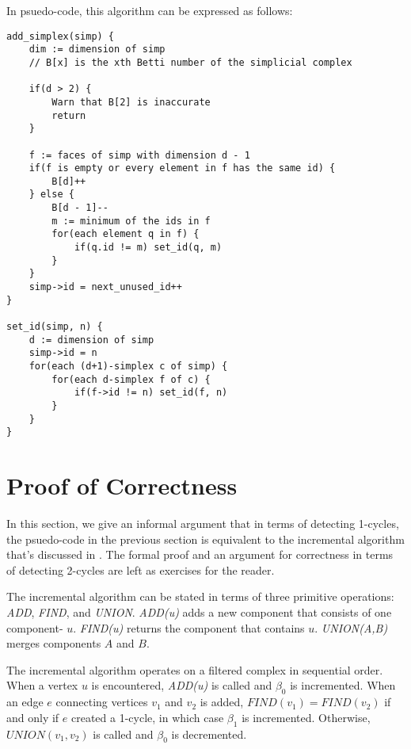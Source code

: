 \documentclass{article}
\begin{document}
In psuedo-code, this algorithm can be expressed as follows:
\begin{verbatim}
add_simplex(simp) {
    dim := dimension of simp
    // B[x] is the xth Betti number of the simplicial complex

    if(d > 2) {
        Warn that B[2] is inaccurate
        return
    }

    f := faces of simp with dimension d - 1
    if(f is empty or every element in f has the same id) {
        B[d]++
    } else {
        B[d - 1]--
        m := minimum of the ids in f
        for(each element q in f) {
            if(q.id != m) set_id(q, m)
        }
    }
    simp->id = next_unused_id++
}

set_id(simp, n) {
    d := dimension of simp
    simp->id = n
    for(each (d+1)-simplex c of simp) {
        for(each d-simplex f of c) {
            if(f->id != n) set_id(f, n)
        }
    }
}
\end{verbatim}


\section{Proof of Correctness}

In this section, we give an informal argument that in terms of
detecting 1-cycles, the psuedo-code
in the previous section is equivalent to the
incremental algorithm that's discussed in \cite{delfinado,zomor}. The
formal proof and an argument for correctness in terms of detecting
2-cycles are left as exercises for the reader.

The incremental algorithm can be stated in terms of three primitive
operations: \emph{ADD}, \emph{FIND}, and \emph{UNION}.
\emph{ADD(u)} adds a new component that consists of one component-
$u$.
\emph{FIND(u)} returns the component that contains $u$.
\emph{UNION(A,B)} merges components $A$ and $B$.

The incremental algorithm operates on a filtered complex in
sequential order. When a vertex $u$ is encountered, \emph{ADD(u)}
is called and $\beta_0$ is incremented.
When an edge $e$ connecting vertices $v_1$ and $v_2$ is added,
$FIND(v_1) = FIND(v_2)$ if and only if $e$ created a 1-cycle, in
which case $\beta_1$ is incremented. Otherwise, $UNION(v_1,v_2)$ is
called and $\beta_0$ is decremented.
\end{document}
